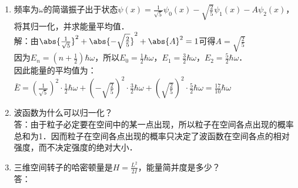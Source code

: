 
\begin{issues}
\issueDraft
\issueTODO
\end{issues}

\subsection{ }
\begin{enumerate}
\item 频率为$\omega$的简谐振子出于状态$\psi(x)=\frac{1}{\sqrt{5}}\psi_0(x)-\sqrt{\frac{2}{5}}\psi_1(x)-A\psi_2(x) $，将其归一化，并求能量平均值．\\
解：由$\abs{\frac{1}{\sqrt{5}}}^2+\abs{-\sqrt{\frac{2}{5}}}^2+\abs{A}^2=1$可得$A=\sqrt{\frac{2}{5}}$\\
因为$E_n=(n+\frac{1}{2})\hbar \omega$，所以$E_0=\frac{1}{2}\hbar\omega$，$E_1=\frac{3}{2}\hbar\omega$，$E_2=\frac{5}{2}\hbar\omega$．\\
因此能量的平均值为：\\
$\bar{E}=(\frac{1}{\sqrt{5}})^2\cdot\frac{1}{2}\hbar\omega+(-\sqrt{\frac{2}{5}})^2\cdot\frac{3}{2}\hbar\omega+(\sqrt{\frac{2}{5}})^2\cdot\frac{5}{2}\hbar\omega=\frac{17}{10}\hbar\omega $
\item 波函数为什么可以归一化？\\
答：由于粒子必定要在空间中的某一点出现，所以粒子在空间各点出现的概率总和为1．因而粒子在空间各点出现的概率只决定了波函数在空间各点的相对强度，而不决定强度的绝对大小．
\item 三维空间转子的哈密顿量是$H=\frac{L^2}{2I}$，能量简并度是多少？\\
答：
\end{enumerate}
